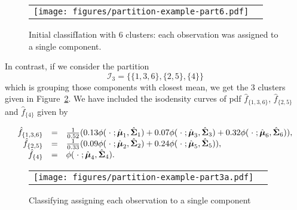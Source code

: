 \documentclass[10pt, a4paper]{article}
\DeclareMathOperator*{\argmax}{arg\,max}
\newcommand{\m}[1]{\boldsymbol{#1}}
\begin{document}




\begin{figure}[!h]
\begin{center}
\begin{tabular}{cc}
  \texttt{[image: figures/partition-example-part6.pdf]} \\
 \end{tabular}
 \caption{ Initial classifIation with 6 clusters: each observation was assigned to a single component.}\label{ex_part6}
\end{center}
\end{figure}

In contrast, if we consider the partition
\[\mathcal{I}_3 = \{\{1, 3, 6\},\{2, 5\},\{4\}\}\]
which is grouping those components with closest mean, we get the 3 clusters given in Figure~\ref{ex_part3a}. We have included the isodensity curves of pdf $\hat{f}_{\{1,3,6\}}$, $\hat{f}_{\{2, 5\}}$ and $\hat{f}_{\{4\}}$ given by

\[ 
\begin{array}{r c l}
\hat{f}_{\{1,3,6\}} & = & \frac{1}{0.52}(0.13 \phi(\;\cdot\; ; \hat{\m\mu}_1, \hat{\m\Sigma}_1) + 0.07 \phi(\;\cdot\; ; \hat{\m\mu}_3, \hat{\m\Sigma}_3) + 0.32 \phi(\;\cdot\; ; \hat{\m\mu}_6, \hat{\m\Sigma}_6)), \\
\hat{f}_{\{2, 5\}} & = &  \frac{1}{0.33}(0.09 \phi(\;\cdot\; ; \hat{\m\mu}_2, \hat{\m\Sigma}_2) + 0.24 \phi(\;\cdot\; ; \hat{\m\mu}_5, \hat{\m\Sigma}_5)), \\
\hat{f}_{\{4\}} & = &\phi(\;\cdot\; ; \hat{\m\mu}_4, \hat{\m\Sigma}_4).
\end{array} 
\]
  


\begin{figure}[!h]
\begin{center}
\begin{tabular}{cc}
  \texttt{[image: figures/partition-example-part3a.pdf]} \\
 \end{tabular}
 \caption{Classifying assigning each observation to a single component}\label{ex_part3a}
\end{center}
\end{figure}
\end{document}
